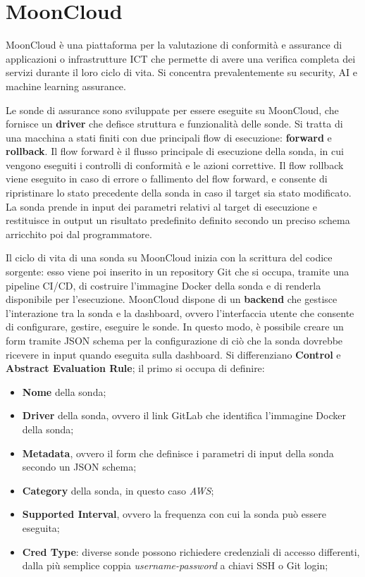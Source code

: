 \section{MoonCloud}
\label{sec:mooncloud}

MoonCloud è una piattaforma per la valutazione di conformità e assurance di applicazioni o infrastrutture ICT che permette di avere una verifica completa dei servizi durante il loro ciclo di vita. Si concentra prevalentemente su security, AI e machine learning assurance.

Le sonde di assurance sono sviluppate per essere eseguite su MoonCloud, che fornisce un \textbf{driver} che defisce struttura e funzionalità delle sonde. Si tratta di una macchina a stati finiti con due principali flow di esecuzione: \textbf{forward} e \textbf{rollback}. Il flow forward è il flusso principale di esecuzione della sonda, in cui vengono eseguiti i controlli di conformità e le azioni correttive. Il flow rollback viene eseguito in caso di errore o fallimento del flow forward, e consente di ripristinare lo stato precedente della sonda in caso il target sia stato modificato. La sonda prende in input dei parametri relativi al target di esecuzione e restituisce in output un risultato predefinito definito secondo un preciso schema arricchito poi dal programmatore.

Il ciclo di vita di una sonda su MoonCloud inizia con la scrittura del codice sorgente: esso viene poi inserito in un repository Git che si occupa, tramite una pipeline CI/CD, di costruire l'immagine Docker della sonda e di renderla disponibile per l'esecuzione. MoonCloud dispone di un \textbf{backend} che gestisce l'interazione tra la sonda e la dashboard, ovvero l'interfaccia utente che consente di configurare, gestire, eseguire le sonde. In questo modo, è possibile creare un form tramite JSON schema per la configurazione di ciò che la sonda dovrebbe ricevere in input quando eseguita sulla dashboard. Si differenziano \textbf{Control} e \textbf{Abstract Evaluation Rule};
il primo si occupa di definire:

\begin{itemize}
    \item \textbf{Nome} della sonda;
    \item \textbf{Driver} della sonda, ovvero il link GitLab che identifica l'immagine Docker della sonda;
    \item \textbf{Metadata}, ovvero il form che definisce i parametri di input della sonda secondo un JSON schema;
    \item \textbf{Category} della sonda, in questo caso \textit{AWS};
    \item \textbf{Supported Interval}, ovvero la frequenza con cui la sonda può essere eseguita;
    \item \textbf{Cred Type}: diverse sonde possono richiedere credenziali di accesso differenti, dalla più semplice coppia \textit{username-password} a chiavi SSH o Git login;
\end{itemize}

